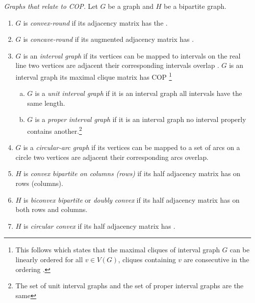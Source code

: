 \begin{definition}{\emph{Graphs that relate to
      COP.\cite[Def.~2.5]{d08phd}}} %
  \label{def:graphwithcop} %
  Let $G$ be a graph and $H$ be a bipartite graph.
  \begin{enumerate}
  \item $G$ is \emph{convex-round} if its adjacency matrix has the
    \CROP.
  \item \label{def::concave-round} $G$ is \emph{concave-round} if its
    augmented adjacency matrix has \CROP. 
  \item $G$ is an \emph{interval graph} if its vertices can be mapped
    to intervals on the real line \stt two vertices are adjacent \iff
    their corresponding intervals overlap .  $G$ is an interval graph \iff its maximal clique matrix
    has COP \cite{fg65}\footnote{This follows \cite{gh64} which states
      that the maximal cliques of interval graph $G$ can be linearly
      ordered \stt for all $v \in V(G)$, cliques containing $v$ are
      consecutive in the ordering \cite[Th. 8.1]{mcg04}.}
    \begin{enumerate}[a.]
    \item $G$ is a \emph{unit interval graph} if it is an interval
      graph \stt all intervals have the same length.\footnotemark[2]
    \item $G$ is a \emph{proper interval graph} if it is an interval
      graph \stt no interval properly contains another.\footnote{The
        set of unit interval graphs and the set of proper interval
        graphs are the same} 
    \end{enumerate}
 \item $G$ is a \emph{circular-arc graph} if its vertices can be
    mapped to a set of arcs on a circle \stt two vertices are adjacent
    \iff their corresponding arcs overlap.
  \item $H$ is \emph{convex bipartite on columns (rows)} if its half
    adjacency matrix has \COP on rows (columns).%
    \label{def::convexbi}
  \item $H$ is \emph{biconvex bipartite} or \emph{doubly
      convex}\cite{yc95} if its half adjacency matrix has \COP on both
    rows and columns.
  \item $H$ is \emph{circular convex} if its half adjacency matrix has
    \CROP.
  \end{enumerate}
\end{definition}

